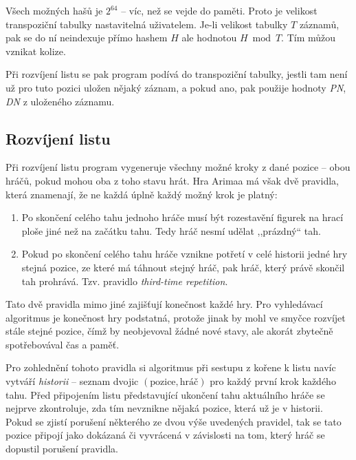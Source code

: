 \documentclass{article}
\begin{document}
Všech možných hašů je $2^{64}$ -- víc, než se vejde do paměti. Proto je velikost transpoziční tabulky nastavitelná
uživatelem. Je-li velikost tabulky $T$ záznamů, pak se do ní neindexuje přímo hashem $H$ ale hodnotou $H \bmod T$. Tím
můžou vznikat kolize.

Při rozvíjení listu se pak program podívá do transpoziční tabulky, jestli tam není už pro tuto pozici uložen nějaký
záznam, a pokud ano, pak použije hodnoty \emph{PN}, \emph{DN} z uloženého záznamu.

\subsection{Rozvíjení listu}
Při rozvíjení listu program vygeneruje všechny možné kroky z dané pozice -- obou hráčů, pokud mohou oba z toho stavu
hrát. Hra Arimaa má však dvě pravidla, která znamenají, že ne každá úplně každý možný krok je platný:
\begin{enumerate}
  \item Po skončení celého tahu jednoho hráče musí být rozestavění figurek na hrací ploše jiné než na začátku tahu. Tedy
  hráč nesmí udělat ,,prázdný`` tah.
  \item Pokud po skončení celého tahu hráče vznikne potřetí v celé historii jedné hry stejná pozice, ze které má táhnout
  stejný hráč, pak hráč, který právě skončil tah prohrává. Tzv. pravidlo \emph{third-time repetition}.
\end{enumerate}

Tato dvě pravidla mimo jiné zajišťují konečnost každé hry. Pro vyhledávací algoritmus je konečnost hry podstatná,
protože jinak by mohl ve smyčce rozvíjet stále stejné pozice, čímž by neobjevoval žádné nové stavy, ale akorát zbytečně
spotřebovával čas a paměť.

Pro zohlednění tohoto pravidla si algoritmus při sestupu z kořene k listu navíc vytváří \emph{historii} -- seznam dvojic
$(\text{pozice}, \text{hráč})$ pro každý první krok každého tahu. Před připojením listu představující ukončení tahu
aktuálního hráče se nejprve zkontroluje, zda tím nevznikne nějaká pozice, která už je v historii. Pokud se zjistí
porušení některého ze dvou výše uvedených pravidel, tak se tato pozice připojí jako dokázaná či vyvrácená v závislosti
na tom, který hráč se dopustil porušení pravidla.
\end{document}
